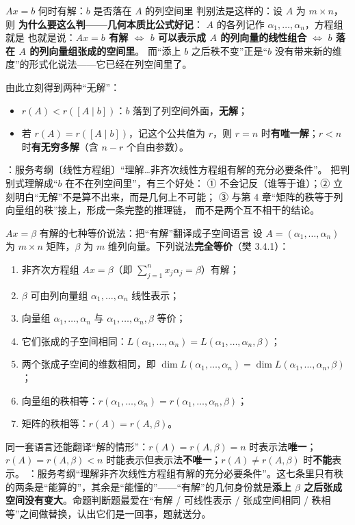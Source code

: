 \begin{fdeep}{$A x=b$ 何时有解：$b$ 是否落在 $A$ 的列空间里}
判别法是这样的：设 $A$ 为 $m\times n$，则
\textbf{为什么要这么判——几何本质比公式好记}：
$A$ 的各列记作 $\alpha_1,\dots,\alpha_n$，方程组就是
也就是说：\textbf{$Ax=b$ 有解 $\iff$ $b$ 可以表示成 $A$ 的列向量的线性组合}
$\iff$ \textbf{$b$ 落在 $A$ 的列向量组张成的空间里}。
而“添上 $b$ 之后秩不变”正是“$b$ 没有带来新的维度”的形式化说法——它已经在列空间里了。

由此立刻得到两种“无解”：
\begin{itemize}[leftmargin=2.2em,itemsep=0.25em]
\item $r(A)<r([A\mid b])$：$b$ 落到了列空间外面，\textbf{无解}；
\item 若 $r(A)=r([A\mid b])$，记这个公共值为 $r$，则 $r=n$ 时\textbf{有唯一解}；$r<n$ 时\textbf{有无穷多解}（含 $n-r$ 个自由参数）。
\end{itemize}

\fbref{}：服务考纲〔线性方程组〕“理解…非齐次线性方程组有解的充分必要条件”。
把判别式理解成“$b$ 在不在列空间里”，有三个好处：
① 不会记反（谁等于谁）；② 立刻明白“无解”不是算不出来，而是几何上不可能；
③ 与第 4 章“矩阵的秩等于列向量组的秩”接上，形成一条完整的推理链，
而不是两个互不相干的结论。
\end{fdeep}

\begin{fdeep}{$Ax=\beta$ 有解的七种等价说法：把“有解”翻译成子空间语言}
设 $A=(\alpha_1,\dots,\alpha_n)$ 为 $m\times n$ 矩阵，$\beta$ 为 $m$ 维列向量。下列说法\textbf{完全等价}（樊 3.4.1）：
\begin{enumerate}[leftmargin=2.2em,itemsep=0.2em]
\item 非齐次方程组 $Ax=\beta$（即 $\sum_{j=1}^{n}x_j\alpha_j=\beta$）有解；
\item $\beta$ 可由列向量组 $\alpha_1,\dots,\alpha_n$ 线性表示；
\item 向量组 $\alpha_1,\dots,\alpha_n$ 与 $\alpha_1,\dots,\alpha_n,\beta$ 等价；
\item 它们张成的子空间相同：$L(\alpha_1,\dots,\alpha_n)=L(\alpha_1,\dots,\alpha_n,\beta)$；
\item 两个张成子空间的维数相同，即 $\dim L(\alpha_1,\dots,\alpha_n)=\dim L(\alpha_1,\dots,\alpha_n,\beta)$；
\item 向量组的秩相等：$r(\alpha_1,\dots,\alpha_n)=r(\alpha_1,\dots,\alpha_n,\beta)$；
\item 矩阵的秩相等：$r(A)=r(A,\beta)$。
\end{enumerate}
同一套语言还能翻译“解的情形”：$r(A)=r(A,\beta)=n$ 时表示法\textbf{唯一}；$r(A)=r(A,\beta)<n$ 时能表示但表示法\textbf{不唯一}；$r(A)\ne r(A,\beta)$ 时\textbf{不能}表示。
\fbref{}：服务考纲“理解非齐次线性方程组有解的充分必要条件”。这七条里只有秩的两条是“能算的”，其余是“能懂的”——“有解”的几何身份就是\textbf{添上 $\beta$ 之后张成空间没有变大}。命题判断题最爱在“有解 / 可线性表示 / 张成空间相同 / 秩相等”之间做替换，认出它们是一回事，题就送分。
\end{fdeep}

